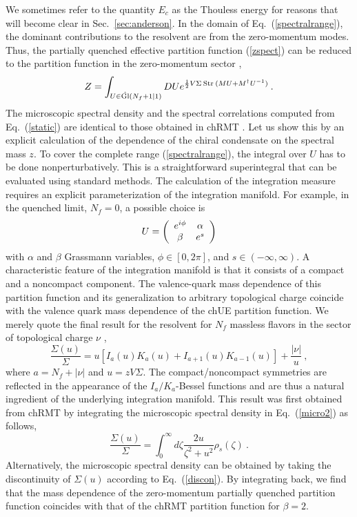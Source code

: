 We sometimes refer to the quantity $E_c$ as the Thouless energy 
for reasons that will become clear in Sec.~\ref{sec:anderson}.  In the
domain of Eq.~(\ref{spectralrange}), the dominant contributions to the
resolvent are from the zero-momentum modes.  Thus, the partially
quenched effective partition function (\ref{zspect}) can be reduced to
the partition function in the zero-momentum sector \cite{OTV,Damg99},
\begin{equation}
  \label{static}
  Z= \int_{U\in {\hat{\rm Gl}}(N_f+1|1)} DU e^{\frac12 
    V\Sigma\:{\rm Str\:}(MU + M^\dagger U^{-1})}\:.
\end{equation}
The microscopic spectral density and the spectral correlations
computed from Eq.~(\ref{static}) are identical to those obtained in chRMT
\cite{Verb96,Trento}.  Let us show this by an explicit calculation of
the dependence of the chiral condensate on the spectral mass $z$. To
cover the complete range (\ref{spectralrange}), the integral over $U$
has to be done nonperturbatively.  This is a straightforward
superintegral that can be evaluated using standard methods. The
calculation of the integration measure requires an explicit
parameterization of the integration manifold. For example, in the
quenched limit, $N_f = 0$, a possible choice is
\begin{equation}
  U = \left ( \begin{array}{cc} e^{i\phi} & \alpha \\ \beta & e^s \end{array} \right )
\end{equation} 
with $\alpha $ and $\beta$ Grassmann variables, $\phi \in [0, 2\pi]$,
and $s \in (-\infty, \infty)$. A characteristic feature of the
integration manifold is that it consists of a compact and a noncompact
component.  The valence-quark mass dependence of this partition
function and its generalization to arbitrary topological charge
coincide with the valence quark mass dependence of the chUE partition
function.  We merely quote the final result for the resolvent for $N_f$
massless flavors in the sector of topological charge $\nu$
\cite{Verb96},
\begin{equation}
  \label{valk}
  \frac{\Sigma(u)}{\Sigma} = u\left[I_{a}(u)K_{a}(u) 
    +I_{a+1}(u)K_{a-1}(u)\right]+\frac{|\nu|}{u}\:,
\end{equation}
where $ a= N_f+|\nu|$ and $u= zV\Sigma$.  The compact/noncompact
symmetries are reflected in the appearance of the $I_a/K_a$-Bessel
functions and are thus a natural ingredient of the underlying
integration manifold. This result was first obtained from chRMT by
integrating the microscopic spectral density in Eq.~(\ref{micro2}) as
follows,
\begin{equation}
 \frac{\Sigma(u)}{\Sigma} = \int_0^\infty d\zeta 
 \frac{2u}{\zeta^2+u^2}\rho_s(\zeta)\:. 
\end{equation}
Alternatively, the microscopic spectral density can be obtained by
taking the discontinuity of $\Sigma(u)$ according to
Eq.~(\ref{discon}).  By integrating back, we find that the mass
dependence of the zero-momentum partially quenched partition function
coincides with that of the chRMT partition function for $\beta=2$.

